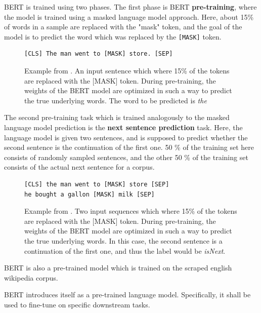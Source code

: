 \documentclass[a4paper,12pt,twoside,openright]{report}
\begin{document}
BERT is trained using two phases. 
The first phase is BERT \textbf{pre-training}, where the model is trained using a masked language model approach. 
Here, about 15\% of words in a sample are replaced with the "mask" token, and the goal of the model is to predict the word which was replaced by the \Verb#[MASK]# token.

\begin{figure}[H]
\begin{verbatim}
[CLS] The man went to [MASK] store. [SEP]
\end{verbatim}
\caption{Example from \cite{devlin18}. 
An input sentence which where 15\% of the tokens are replaced with the [MASK] token. 
During pre-training, the weights of the BERT model are optimized in such a way to predict the true underlying words.
The word to be predicted is \textit{the}
}
\end{figure}

The second pre-training task which is trained analogously to the masked language model prediction is the \textbf{next sentence prediction} task.
Here, the language model is given two sentences, and is supposed to predict whether the second sentence is the continuation of the first one.
50 \% of the training set here consists of randomly sampled sentences, and the other 50 \% of the training set consists of the actual next sentence for a corpus.

\begin{figure}[H]
\begin{verbatim}
[CLS] the man went to [MASK] store [SEP]
he bought a gallon [MASK] milk [SEP]
\end{verbatim}
\caption{Example from \cite{devlin18}. 
Two input sequences which where 15\% of the tokens are replaced with the [MASK] token. 
During pre-training, the weights of the BERT model are optimized in such a way to predict the true underlying words.
In this case, the second sentence is a continuation of the first one, and thus the label would be \textit{isNext}.
}
\end{figure}




BERT is also a pre-trained model which is trained on the scraped english wikipedia corpus.

BERT introduces itself as a pre-trained language model.
Specifically, it shall be used to fine-tune on specific downstream tasks.

\end{document}
